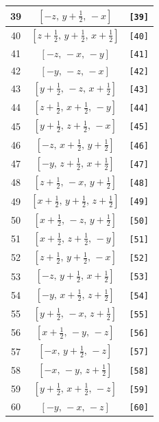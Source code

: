\documentclass[fleqn,8pt]{jsarticle}
\begin{document}
\begin{longtable}{ccc}
39 & $\left[ - z,\, y + \frac{1}{2},\, - x \right]$ & {\tt [39]} \\ \hline
40 & $\left[ z + \frac{1}{2},\, y + \frac{1}{2},\, x + \frac{1}{2} \right]$ & {\tt [40]} \\ \hline
41 & $\left[ - z,\, - x,\, - y \right]$ & {\tt [41]} \\ \hline
42 & $\left[ - y,\, - z,\, - x \right]$ & {\tt [42]} \\ \hline
43 & $\left[ y + \frac{1}{2},\, - z,\, x + \frac{1}{2} \right]$ & {\tt [43]} \\ \hline
44 & $\left[ z + \frac{1}{2},\, x + \frac{1}{2},\, - y \right]$ & {\tt [44]} \\ \hline
45 & $\left[ y + \frac{1}{2},\, z + \frac{1}{2},\, - x \right]$ & {\tt [45]} \\ \hline
46 & $\left[ - z,\, x + \frac{1}{2},\, y + \frac{1}{2} \right]$ & {\tt [46]} \\ \hline
47 & $\left[ - y,\, z + \frac{1}{2},\, x + \frac{1}{2} \right]$ & {\tt [47]} \\ \hline
48 & $\left[ z + \frac{1}{2},\, - x,\, y + \frac{1}{2} \right]$ & {\tt [48]} \\ \hline
49 & $\left[ x + \frac{1}{2},\, y + \frac{1}{2},\, z + \frac{1}{2} \right]$ & {\tt [49]} \\ \hline
50 & $\left[ x + \frac{1}{2},\, - z,\, y + \frac{1}{2} \right]$ & {\tt [50]} \\ \hline
51 & $\left[ x + \frac{1}{2},\, z + \frac{1}{2},\, - y \right]$ & {\tt [51]} \\ \hline
52 & $\left[ z + \frac{1}{2},\, y + \frac{1}{2},\, - x \right]$ & {\tt [52]} \\ \hline
53 & $\left[ - z,\, y + \frac{1}{2},\, x + \frac{1}{2} \right]$ & {\tt [53]} \\ \hline
54 & $\left[ - y,\, x + \frac{1}{2},\, z + \frac{1}{2} \right]$ & {\tt [54]} \\ \hline
55 & $\left[ y + \frac{1}{2},\, - x,\, z + \frac{1}{2} \right]$ & {\tt [55]} \\ \hline
56 & $\left[ x + \frac{1}{2},\, - y,\, - z \right]$ & {\tt [56]} \\ \hline
57 & $\left[ - x,\, y + \frac{1}{2},\, - z \right]$ & {\tt [57]} \\ \hline
58 & $\left[ - x,\, - y,\, z + \frac{1}{2} \right]$ & {\tt [58]} \\ \hline
59 & $\left[ y + \frac{1}{2},\, x + \frac{1}{2},\, - z \right]$ & {\tt [59]} \\ \hline
60 & $\left[ - y,\, - x,\, - z \right]$ & {\tt [60]} \\ \hline

\end{longtable}
\end{document}
